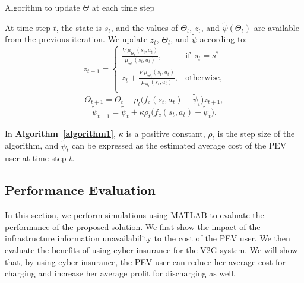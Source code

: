 \documentclass[twocolumn,10pt]{IEEEtran}
\begin{document}
\begin{algorithm}
\caption{Algorithm to update $\Theta$ at each time step}
\label{algorithm1}
	At time step $t$, the state is $s_t$, and the values of $\Theta_t$, $z_t$, and $\widetilde{\psi}(\Theta_t)$ are available from the previous iteration. We update $z_t$, $\Theta_t$, and $\widetilde{\psi}$ according to: \\
	\begin{equation}
	z_{t+1} = \left\{ 
	\begin{array}{ll}
	\frac{\nabla \mu_{\Theta_{t}}(s_{t},a_{t})}{\mu_{\Theta_{t}}(s_{t},a_{t})}, & \text{if} \phantom{1} s_{t} = s^{*}\\
	z_{t}+\frac{\nabla \mu_{\Theta_{t}}(s_{t},a_{t})}{\mu_{\Theta_{k}}(s_{t},a_{t})}, & \text{otherwise,} \\
	\end{array}
	\right.
	\label{eq:zupdate_state}
	\end{equation}
	\begin{equation}
	\Theta_{t+1} = \Theta_{t} - \rho_{t} \big( f_c (s_t, a_t) -\widetilde{\psi}_{t} \big) z_{t+1}, 
	\end{equation}
	\begin{equation}
	\widetilde{\psi}_{t+1} = \widetilde{\psi}_{t} + \kappa\rho_{t} \big( f_c (s_t, a_t) - \widetilde{\psi}_{t} \big).
	\end{equation}
\end{algorithm}

In \textbf{Algorithm~\ref{algorithm1}}, $\kappa$ is a positive constant, $\rho_{t}$ is the step size of the algorithm, and $\widetilde{\psi}_{t}$ can be expressed as the estimated average cost of the PEV user at time step $t$. 

\subsection{Performance Evaluation}
\label{sec: Performance Evaluation}

In this section, we perform simulations using MATLAB to evaluate the performance of the proposed solution. We first show the impact of the infrastructure information unavailability to the cost of the PEV user. We then evaluate the benefits of using cyber insurance for the V2G system. We will show that, by using cyber insurance, the PEV user can reduce her average cost for charging and increase her average profit for discharging as well. 
\end{document}

